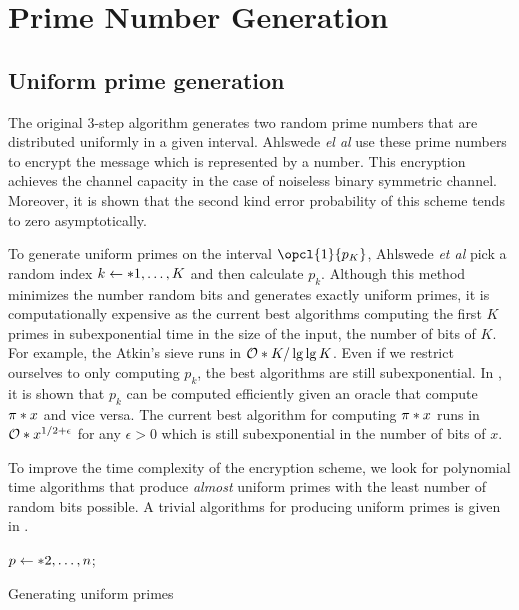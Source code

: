 \section{Prime Number Generation}
\subsection{Uniform prime generation}\label{subsec:unifprime}
The original 3-step algorithm \cite{multiway} generates two random prime numbers that are distributed uniformly in a given interval. Ahlswede \textit{el al} use these prime numbers to encrypt the message which is represented by a number. This encryption achieves the channel capacity in the case of noiseless binary symmetric channel. Moreover, it is shown that the second kind error probability of this scheme tends to zero asymptotically. 

To generate uniform primes on the interval \(\opcl{1}{p_K}\), Ahlswede \textit{et al} pick a random index \(k \gets \set{1, \dots, K}\) and then calculate \(p_k\). Although this method minimizes the number random bits and generates exactly uniform primes, it is computationally expensive as the current best algorithms computing the first \(K\) primes in subexponential time in the size of the input, the number of bits of \(K\). For example, the Atkin's sieve \cite{atkin} runs in \(\bigO{K / \lg \lg K}\). Even if we restrict ourselves to only computing \(p_k\), the best algorithms are still subexponential. In \cite[Chapter 9.9]{bach}, it is shown that \(p_k\) can be computed efficiently given an oracle that compute \(\func{\pi}{x}\) and vice versa. The current best algorithm for computing \(\func{\pi}{x}\) runs in \(\bigO{x^{1/2 + \epsilon}}\)\cite{lagarias} for any \(\epsilon > 0\) which is still subexponential in the number of bits of \(x\).  

To improve the time complexity of the encryption scheme, we look for polynomial time algorithms that produce \textit{almost} uniform primes with the least number of random bits possible. A trivial algorithms for producing uniform primes is given in .
\begin{algorithm}
	\DontPrintSemicolon
    {
        \(p \gets \set{2,\dots, n}\);
    }
	\caption{Generating uniform primes}
    \label{alg:trivialPNG}
\end{algorithm}

